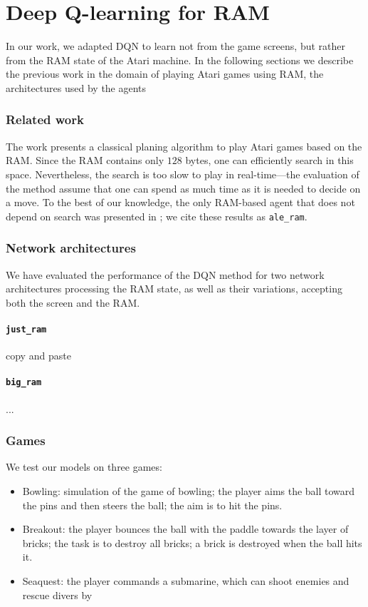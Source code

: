 \chapter{Deep Q-learning for RAM}\label{dqn-ram}
In our work, we adapted DQN to learn not from the game screens, but rather from the RAM state of the Atari machine. In the following sections we describe the previous work in the domain of playing Atari games using RAM, the architectures used by the agents

\subsection{Related work}
The work \cite{Nir} presents a classical planing algorithm to play Atari games based on the RAM. Since the RAM contains only $128$ bytes, one can efficiently search in this space. Nevertheless, the search is too slow to play in real-time---the evaluation of the method assume that one can spend as much time as it is needed to decide on a move. To the best of our knowledge, the only RAM-based agent that does not depend on search was presented in \cite{ale}; we cite these results as \texttt{ale\_ram}.

\subsection{Network architectures}
We have evaluated the performance of the DQN method for two network architectures processing the RAM state, as well as their variations, accepting both the screen and the RAM.

\subsubsection{\texttt{just\_ram}}
copy and paste

\subsubsection{\texttt{big\_ram}}
...

\subsection{Games}
We test our models on three games: 
\begin{itemize}
\item Bowling: simulation of the game of bowling; the player aims the ball toward the pins and then steers the ball; the aim is to hit the pins.
\item Breakout: the player bounces the ball with the paddle towards the layer of bricks; the task is to destroy all bricks; a brick is destroyed when the ball hits it.
\item Seaquest: the player commands a submarine, which can shoot enemies and rescue divers by
\end{itemize}

